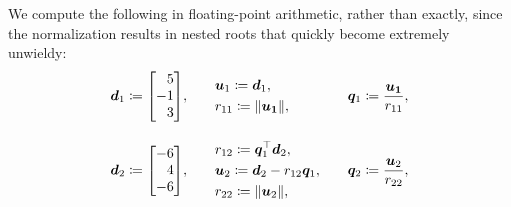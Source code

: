 \documentclass[11pt]{article}
\begin{document}
\begin{enumerate}
          We compute the following in floating-point arithmetic, rather than exactly, since the
          normalization results in nested roots that quickly become extremely unwieldy:
          \[
              \begin{alignedat}{3}
                   &
                  \vect{d}_1
                  \coloneq
                  \begin{bmatrix*}[r]
                      5 \\ -1 \\ 3
                  \end{bmatrix*}
                  \! ,
                  \qquad
                   &   &
                  \begin{aligned}{}
                       &
                      \vect{u}_1
                      \coloneq
                      \vect{d}_1,
                      \\
                       &
                      r_{11} \coloneq \norm{\vect{u_1}},
                  \end{aligned}
                   &   &
                  \vect{q}_1
                  \coloneq
                  \frac{\vect{u_1}}{r_{11}}
                  ,
                  \\[1em]
                   &
                  \vect{d}_2
                  \coloneq
                  \begin{bmatrix*}[r]
                      -6 \\ 4 \\ -6
                  \end{bmatrix*}
                  \! ,
                  \qquad
                   &   &
                  \begin{aligned}
                       &
                      r_{12} \coloneq \vect{q}_1^\top \vect{d}_2,
                      \\
                       &
                      \vect{u}_2
                      \coloneq
                      \vect{d}_2
                      - r_{12} \vect{q}_1,
                      \\
                       &
                      r_{22} \coloneq \norm{\vect{u}_2},
                  \end{aligned}
                  \qquad
                   &   &
                  \vect{q}_2
                  \coloneq
                  \frac{\vect{u}_2}{r_{22}}
                  ,
                  \\[1em]
                   &

\end{alignedat}\]
\end{enumerate}
\end{document}
